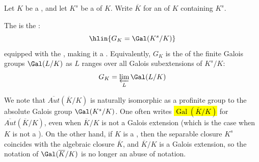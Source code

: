 \begin{definition} \label{definition:absolute_galois_group_of_a_field}
    Let $K$ be a , and let $K^s$ be a  of $K$. Write $\overline{K}$ for an  of $K$ containing $K^s$.

    The  is the :
    $$\hlin{G_K = \Gal(K^s/K)}$$
    equipped with the , making it a . Equivalently, $G_K$ is the  of the finite Galois groups $\Gal(L/K)$ as $L$ ranges over all  Galois subextensions of $K^s/K$:
    $$G_K = \varprojlim_{L} \Gal(L/K)$$

    We note that $\overline{Aut}(\overline{K}/K)$ is naturally isomorphic as a profinite group to the absolute Galois group $\Gal(K^s/K)$. One often writes \hl{$\operatorname{Gal}(\overline{K}/K)$} for $\overline{Aut}(\overline{K}/K)$, even when $\overline{K}/K$ is not a Galois extension (which is the case when $K$ is not a ). On the other hand, if $K$ is a , then the separable closure $K^s$ coincides with the algebraic closure $\overline{K}$, and $\overline{K}/K$ is a Galois extension, so the notation of $\Gal(\overline{K}/K)$ is no longer an abuse of notation. 
\end{definition}
